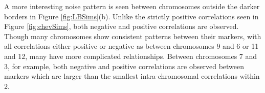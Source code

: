 \documentclass{article}
\newcommand{\code}[1]{\texttt{#1}}
\newcommand*{\R}{\textsf{R}$~$}
\newcommand{\m}[1]{\mathbf{#1}}               %
\begin{document}
A more interesting noise pattern is seen between chromosomes outside the darker borders in Figure \ref{fig:LBSims}(b). Unlike the strictly positive correlations seen in Figure \ref{fig:chevSims}, both negative and positive correlations are observed. Though many chromosomes show consistent patterns between their markers, with all correlations either positive or negative as between chromosomes 9 and 6 or 11 and 12, many have more complicated relationships. Between chromosomes 7 and 3, for example, both negative and positive correlations are observed between markers which are larger than the smallest intra-chromosomal correlations within 2.





\end{document}
